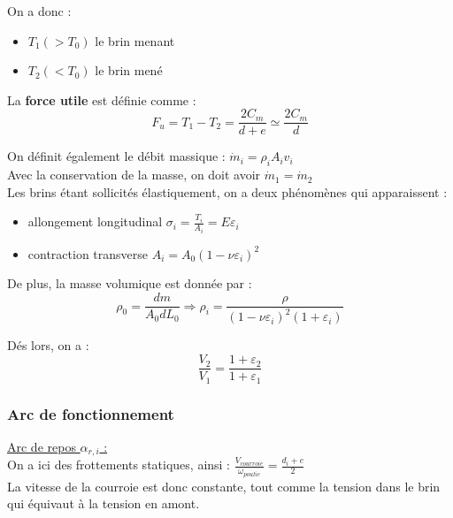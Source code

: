 \documentclass[../main.tex]{subfiles}
\begin{document}
On a donc : \begin{itemize}
    \item $T_1(>T_0)$ le brin menant\\
    \item $T_2 (<T_0)$ le brin mené\\
\end{itemize}

La \textbf{force utile} est définie comme : \begin{equation}
    F_u = T_1-T_2 = \frac{2C_m}{d+e} \simeq \frac{2C_m}{d}
\end{equation}

On définit également le débit massique : $\dot{m}_i = \rho_i A_i v_i$\\
Avec la conservation de la masse, on doit avoir $\dot{m}_1 = \dot{m}_2$\\

Les brins étant sollicités élastiquement, on a deux phénomènes qui apparaissent : \begin{itemize}
    \item allongement longitudinal $\sigma_i = \frac{T_i}{A_i} = E \varepsilon_i$\\
    \item contraction transverse $A_i = A_0(1-\nu \varepsilon_i)^2$\\
\end{itemize}

De plus, la masse volumique est donnée par : \\
\begin{equation}
    \rho_0 = \frac{dm}{A_0 dL_0} \Rightarrow \rho_i = \frac{\rho}{(1-\nu \varepsilon_i)^2(1+\varepsilon_i)}
\end{equation}

Dés lors, on a : \begin{equation}
    \frac{V_2}{V_1} = \frac{1+\varepsilon_2}{1+\varepsilon_1}
\end{equation}

\subsubsection{Arc de fonctionnement}
\quad \underline{Arc de repos $\alpha_{r,i}$ :}\\
On a ici des frottements statiques, ainsi : $\frac{V_{courroie}}{\omega_{poulie}} = \frac{d_i + e}{2}$\\
La vitesse de la courroie est donc constante, tout comme la tension dans le brin qui équivaut à la tension en amont.\\
\end{document}
